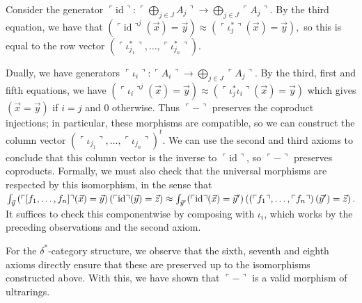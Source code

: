 Consider the generator $\ulcorner\mathrm{id}\urcorner:\ulcorner\bigoplus_{j\in J}A_{j}\urcorner\to%
\bigoplus_{j\in J}\ulcorner A_{j}\urcorner$. By the third equation, we have that $\left(\ulcorner\mathrm{id}\urcorner^{j}(\vec{x})=\vec{y}\right)\approx(%
\ulcorner\iota^{*}_{j}\urcorner(\vec{x})=\vec{y}),$ so this is equal to the row vector $(\ulcorner\iota^{*}_{j_{1}}\urcorner,\dotsc,\ulcorner\iota^{*}_{j_{n}}\urcorner)$.\par
 
 
 
Dually, we have generators $\ulcorner\iota_{i}\urcorner:\ulcorner A_{i}\urcorner\to\bigoplus_{j\in J}%
\ulcorner A_{j}\urcorner$. By the third, first and fifth equations, we have $\left(\ulcorner\iota_{i}\urcorner^{j}(\vec{x})=\vec{y}\right)\approx\left(%
\ulcorner\iota^{*}_{j}\iota_{i}\urcorner(\vec{x})=\vec{y}\right)$ which gives $(\vec{x}=\vec{y})$ if $i=j$ and $0$ otherwise. Thus $\ulcorner-\urcorner$ preserves the coproduct injections; in particular, these morphisms are compatible, so we can construct the column vector $(\ulcorner\iota_{j_{1}}\urcorner,\dotsc,\ulcorner\iota_{j_{n}}\urcorner)^{t}$. We can use the second and third axioms to conclude that this column vector is the inverse to $\ulcorner\mathrm{id}\urcorner$, so $\ulcorner-\urcorner$ preserves coproducts. Formally, we must also check that the universal morphisms are respected by this isomorphism, in the sense that $\int_{\vec{y}}\left(\ulcorner[f_{1},\dotsc,f_{n}]\urcorner(\vec{x})=\vec{y}%
\right)(\ulcorner\mathrm{id}\urcorner(\vec{y})=\vec{z})\approx\int_{\vec{y}^{%
\prime}}(\ulcorner\mathrm{id}\urcorner(\vec{x})=\vec{y}^{\prime})\left(\left(%
\ulcorner f_{1}\urcorner,\dotsc,\ulcorner f_{n}\urcorner\right)(\vec{y}^{%
\prime})=\vec{z}\right).$ It suffices to check this componentwise by composing with $\iota_{i}$, which works by the preceding observations and the second axiom.\par
 
 
 
For the $\delta^{*}$-category structure, we observe that the sixth, seventh and eighth axioms directly ensure that these are preserved up to the isomorphisms constructed above. With this, we have shown that $\ulcorner-\urcorner$ is a valid morphism of ultrarings.\par
 
